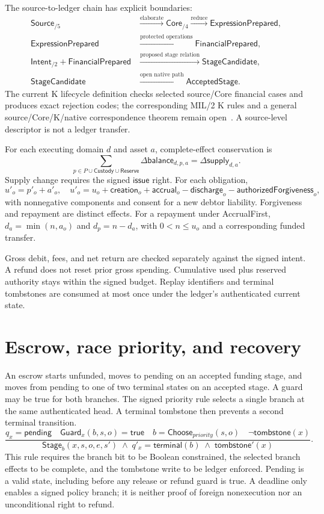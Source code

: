 \documentclass[11pt,a4paper]{article}
\theoremstyle{definition}
\begin{document}
The source-to-ledger chain has explicit boundaries:
\[
\begin{aligned}
\mathsf{Source}_{/5}&\xrightarrow{\text{elaborate}}\mathsf{Core}_{/4}
\xrightarrow{\text{reduce}}\mathsf{ExpressionPrepared},\\
\mathsf{ExpressionPrepared}&\xrightarrow{\text{protected operations}}
\mathsf{FinancialPrepared},\\
\mathsf{Intent}_{/2}+\mathsf{FinancialPrepared}
&\xrightarrow{\text{proposed stage relation}}\mathsf{StageCandidate},\\
\mathsf{StageCandidate}&\xrightarrow{\text{open native path}}
\mathsf{AcceptedStage}.
\end{aligned}
\]
The current K lifecycle definition checks selected source/Core financial cases and produces exact rejection codes; the corresponding MIL/2 K rules and a general source/Core/K/native correspondence theorem remain open~\cite{KDEF}. A source-level descriptor is not a ledger transfer.

For each executing domain $d$ and asset $a$, complete-effect conservation is
\[
\sum_{p\in P\cup\mathsf{Custody}\cup\mathsf{Reserve}}
  \Delta\mathsf{balance}_{d,p,a}
  =\Delta\mathsf{supply}_{d,a}.
\tag{E1}
\]
Supply change requires the signed $\mathsf{issue}$ right. For each obligation,
\[
u'_o=p'_o+a'_o,
\quad
u'_o=u_o+\mathsf{creation}_o+\mathsf{accrual}_o
        -\mathsf{discharge}_o-\mathsf{authorizedForgiveness}_o,
\tag{L1}
\]
with nonnegative components and consent for a new debtor liability. Forgiveness and repayment are distinct effects. For a repayment under AccrualFirst,
$d_a=\min(n,a_o)$ and $d_p=n-d_a$, with $0<n\le u_o$ and a corresponding funded transfer.

Gross debit, fees, and net return are checked separately against the signed intent. A refund does not reset prior gross spending. Cumulative used plus reserved authority stays within the signed budget. Replay identifiers and terminal tombstones are consumed at most once under the ledger's authenticated current state.

\section{Escrow, race priority, and recovery}
An escrow starts unfunded, moves to pending on an accepted funding stage, and moves from pending to one of two terminal states on an accepted stage. A guard may be true for both branches. The signed priority rule selects a single branch at the same authenticated head. A terminal tombstone then prevents a second terminal transition.
\[
\frac{q_x=\mathsf{pending}\quad\mathsf{Guard}_x(b,s,o)=\mathsf{true}
\quad b=\mathsf{Choose}_{priority}(s,o)\quad\neg\mathsf{tombstone}(x)}
{\mathsf{Stage}_b(x,s,o,e,s')\;\land\;
 q'_x=\mathsf{terminal}(b)\;\land\;\mathsf{tombstone}'(x)}.
\tag{ESC}
\]
This rule requires the branch bit to be Boolean constrained, the selected branch effects to be complete, and the tombstone write to be ledger enforced. Pending is a valid state, including before any release or refund guard is true. A deadline only enables a signed policy branch; it is neither proof of foreign nonexecution nor an unconditional right to refund.
\end{document}
